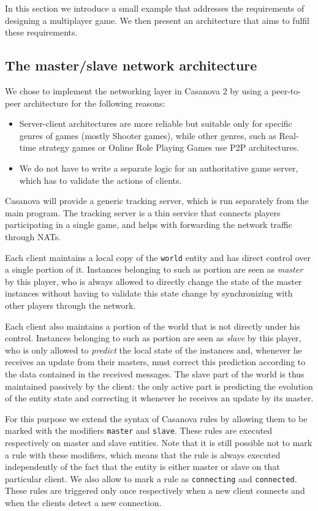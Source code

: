 In this section we introduce a small example that addresses the requirements of designing a multiplayer game. We then present an architecture that aims to fulfil these requirements.

\subsection{The master/slave network architecture}

We chose to implement the networking layer in Casanova 2 by using a peer-to-peer architecture for the following reasons:

\begin{itemize}
	\item Server-client architectures are more reliable but suitable only for specific genres of games (mostly Shooter games), while other genres, such as Real-time strategy games or Online Role Playing Games use P2P architectures.
	\item We do not have to write a separate logic for an authoritative game server, which has to validate the actions of clients.
\end{itemize}

Casanova will provide a generic tracking server, which is run separately from the main program. The tracking server is a thin service that connects players participating in a single game, and helps with forwarding the network traffic through NATs.

Each client maintains a local copy of the \texttt{world} entity and has direct control over a single portion of it. Instances belonging to such as portion are seen as \textit{master} by this player, who is always allowed to directly change the state of the master instances without having to validate this state change by synchronizing with other players through the network.

Each client also maintains a portion of the world that is not directly under his control. Instances belonging to such as portion are seen as \textit{slave} by this player, who is only allowed to \textit{predict} the local state of the instances and, whenever he receives an update from their masters, must correct this prediction according to the data contained in the received messages. The slave part of the world is thus maintained passively by the client: the only active part is predicting the evolution of the entity state and correcting it whenever he receives an update by its master.

For this purpose we extend the syntax of Casanova rules by allowing them to be marked with the modifiers \texttt{master} and \texttt{slave}. These rules are executed respectively on master and slave entities. Note that it is still possible not to mark a rule with these modifiers, which means that the rule is always executed independently of the fact that the entity is either master or slave on that particular client. We also allow to mark a rule as \texttt{connecting} and \texttt{connected}. These rules are triggered only once respectively when a new client connects and when the clients detect a new connection.

